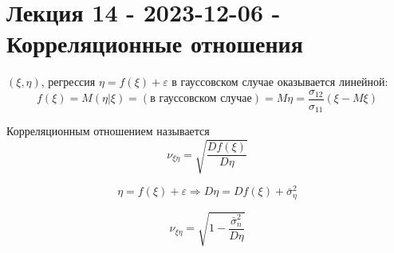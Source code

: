 \section{Лекция 14 - 2023-12-06 - Корреляционные отношения}

$(\xi, \eta)$, регрессия $\eta = f(\xi) + \varepsilon$
в гауссовском случае оказывается линейной:
\[
  f(\xi) = M(\eta | \xi) = (\text{в гауссовском случае}) = M\eta = \dfrac{\sigma_{12}}{\sigma_{11}} (\xi - M\xi)
\]

\begin{definition}
  Корреляционным отношением называется 
  \[
    \nu_{\xi \eta} = \sqrt{\dfrac{Df(\xi)}{D\eta}}
  \]

  \[
    \eta = f(\xi) + \varepsilon \Rightarrow D\eta = Df(\xi) + \bar \sigma_\eta^2
  \]

  \[
    \nu_{\xi \eta} = \sqrt{1 - \dfrac{\bar\sigma^2_n}{D\eta}}
  \]
\end{definition}

